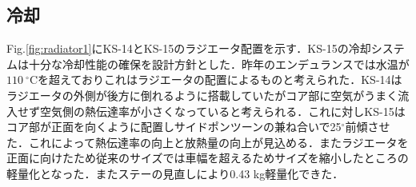 \subsection{冷却}
Fig.\ref{fig:radiator1}にKS-14とKS-15のラジエータ配置を示す．KS-15の冷却システムは十分な冷却性能の確保を設計方針とした．昨年のエンデュランスでは水温が$110 \ {}^\circ\mathrm{C}$を超えておりこれはラジエータの配置によるものと考えられた．KS-14はラジエータの外側が後方に倒れるように搭載していたがコア部に空気がうまく流入せず空気側の熱伝達率が小さくなっていると考えられる．これに対しKS-15はコア部が正面を向くように配置しサイドポンツーンの兼ね合いで25$^\circ$前傾させた．これによって熱伝達率の向上と放熱量の向上が見込める．またラジエータを正面に向けたため従来のサイズでは車幅を超えるためサイズを縮小したところの軽量化となった．またステーの見直しにより0.43 kg軽量化できた．
